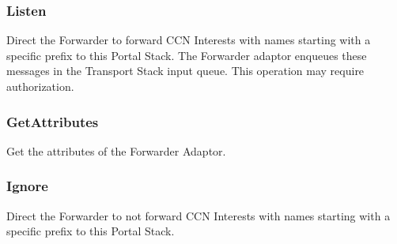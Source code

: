 \subsubsection{Listen}
Direct the Forwarder to forward CCN Interests with names starting with a specific prefix to this Portal Stack.
The Forwarder adaptor enqueues these messages in the Transport Stack input queue.
This operation may require authorization.

\subsubsection{GetAttributes}
Get the attributes of the Forwarder Adaptor.

\subsubsection{Ignore}
Direct the Forwarder to not forward CCN Interests with names starting with a specific prefix to this Portal Stack.


